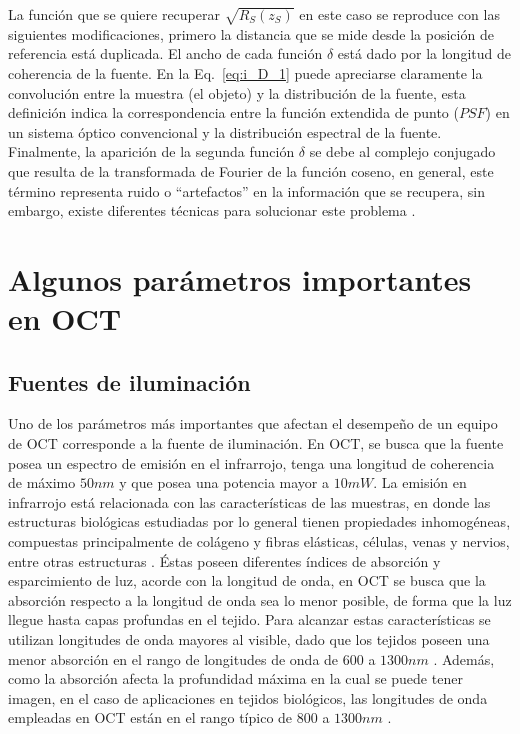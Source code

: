 La función que se quiere recuperar $\sqrt{R_S(z_S)}$ en este caso se reproduce con las siguientes modificaciones, primero la distancia que se mide desde la posición de referencia está duplicada. El ancho de cada función $\delta$ está dado por la longitud de coherencia de la fuente. En la Eq.~\ref{eq:i_D_1} puede apreciarse claramente la convolución entre la muestra (el objeto) y la distribución de la fuente, esta definición indica la correspondencia entre la función extendida de punto ($PSF$) en un sistema óptico convencional y la distribución espectral de la fuente. Finalmente, la aparición de la segunda función $\delta$ se debe al complejo conjugado que resulta de la transformada de Fourier de la función coseno, en general, este término representa ruido o ``artefactos'' en la información que se recupera, sin embargo, existe diferentes técnicas para solucionar este problema \cite{Ho2006,Vergnole2008}.


\section{Algunos parámetros importantes en OCT}
\label{sec:param_important}


\subsection{Fuentes de iluminación}

Uno de los parámetros más importantes que afectan el desempeño de un equipo de OCT corresponde a la fuente de iluminación. En OCT, se busca que la fuente posea un espectro de emisión en el infrarrojo, tenga una longitud de coherencia de máximo $50nm$ y que posea una potencia mayor a $10mW$. La emisión en infrarrojo está relacionada con las características de las muestras, en donde las estructuras biológicas estudiadas por lo general tienen propiedades inhomogéneas, compuestas principalmente de colágeno y fibras elásticas, células, venas y nervios, entre otras estructuras \cite{Fercher2003}. Éstas poseen diferentes índices de absorción y esparcimiento de luz, acorde con la longitud de onda, en OCT se busca que la absorción respecto a la longitud de onda sea lo menor posible, de forma que la luz llegue hasta capas profundas en el tejido. Para alcanzar estas características se utilizan longitudes de onda mayores al visible, dado que los tejidos poseen una menor absorción en el rango de longitudes de onda de $600$ a $1300nm$ \cite{Parsa1989,Brezinski1996}. Además, como la absorción afecta la profundidad máxima en la cual se puede tener imagen, en el caso de aplicaciones en tejidos biológicos, las longitudes de onda empleadas en OCT están en el rango típico de $800$ a $1300nm$ \cite{Drexler2015}.

